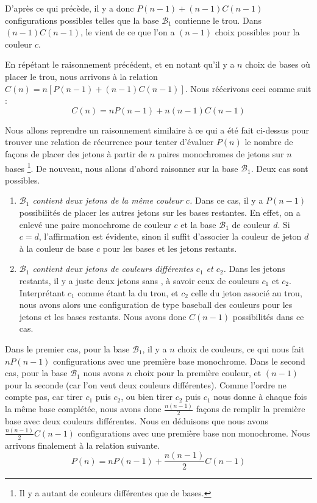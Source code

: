 D'après ce qui précède, il y a donc $P(n - 1) + (n-1) C(n-1)$ configurations possibles telles que la base $\mathcal{B}_1$ contienne le trou. Dans $(n-1) C(n-1)$, le  vient de ce que l'on a $(n-1)$ choix possibles pour la couleur $c$.


\medskip

En répétant le raisonnement précédent, et en notant qu'il y a $n$ choix de bases où placer le trou, nous arrivons à la relation $C(n) = n \left[ P(n - 1) + (n-1) C(n-1) \right]$. Nous réécrivons ceci comme suit :
\begin{equation}
    C(n) = n P(n - 1) + n(n-1) C(n-1)
\end{equation}


Nous allons reprendre un raisonnement similaire à ce qui a été fait ci-dessus pour trouver une relation de récurrence pour tenter d'évaluer $P(n)$ le nombre de façons de placer des jetons à partir de $n$ paires monochromes de jetons sur $n$ bases
\footnote{
   Il y a autant de couleurs différentes que de bases.
}.
De nouveau, nous allons d'abord raisonner sur la base $\mathcal{B}_1$. Deux cas sont possibles.

\begin{enumerate}
    \item \textit{$\mathcal{B}_1$ contient deux jetons de la même couleur $c$.}
    Dans ce cas, il y a $P(n - 1)$ possibilités de placer les autres jetons sur les bases restantes. En effet, on a enlevé une paire monochrome de couleur $c$ et la base $\mathcal{B}_1$ de couleur $d$. Si $c = d$, l'affirmation est évidente, sinon il suffit d'associer la couleur de jeton $d$ à la couleur de base $c$ pour les bases et les jetons restants.
        
    \item \textit{$\mathcal{B}_1$ contient deux jetons de couleurs différentes $c_1$ et $c_2$.}
    Dans les jetons restants, il y a juste deux jetons sans , à savoir ceux de couleurs $c_1$ et $c_2$. Interprétant $c_1$ comme étant la  du trou, et $c_2$ celle du jeton associé au trou, nous avons alors une configuration de type baseball des couleurs pour les jetons et les bases restants. Nous avons donc $C(n - 1)$ possibilités dans ce cas.
\end{enumerate}


\medskip

Dans le premier cas, pour la base $\mathcal{B}_1$, il y a $n$ choix de couleurs, ce qui nous fait $n P(n - 1)$ configurations avec une première base monochrome.
Dans le second cas, pour la base $\mathcal{B}_1$ nous avons $n$ choix pour la première couleur, et $(n - 1)$ pour la seconde (car l'on veut deux couleurs différentes).
Comme l'ordre ne compte pas, car tirer $c_1$ puis $c_2$, ou bien tirer $c_2$ puis $c_1$ nous donne à chaque fois la même base complétée, nous avons donc $\frac{n(n - 1)}{2}$ façons de remplir la première base avec deux couleurs différentes.
Nous en déduisons que nous avons $\frac{n(n-1)}{2} C(n - 1)$ configurations avec une première base non monochrome.
Nous arrivons finalement à la relation suivante.
\begin{equation}
    P(n) = n P(n - 1) + \dfrac{n(n-1)}{2} C(n - 1)
\end{equation}


